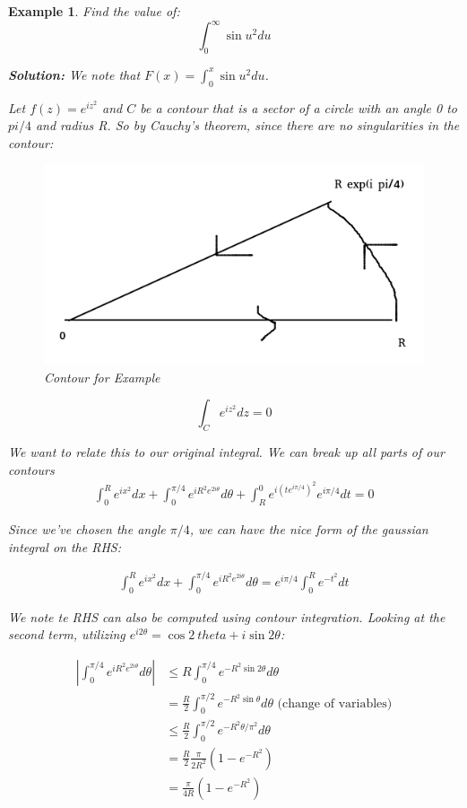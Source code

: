 \documentclass{article}
\newtheorem{ex}{Example}
\theoremstyle{definition}
\begin{document}
\begin{ex}
Find the value of:
$$\int_0^\infty \sin u^2 du$$

\textbf{Solution:}
We note that $F(x) = \int_0^x \sin u^2 du$. 

Let $f(z) = e^{iz^2}$ and $C$ be a contour that is a sector of a circle with an angle 0 to $pi/4$ and radius R. So by Cauchy's theorem, since there are no singularities in the contour:


\begin{figure}[H]
	\centering
	\includegraphics[width=0.4\linewidth]{sector_contour}
	\caption{Contour for Example}
	\label{fig:sectorcontour}
\end{figure}

$$\int_C e^{iz^2} dz=0$$



We want to relate this to our original integral. We can break up all parts of our contours
\begin{align*}
\int_0^R e^{ix^2} dx + \int_0^{\pi/4} e^{i R^2 e^{2i\theta}} d\theta + \int_R^0 e^{i(te^{i\pi/4})^2} e^{i\pi/4} dt = 0 
\end{align*}

Since we've chosen the angle $\pi/4$, we can have the nice form of the gaussian integral on the RHS: 

\begin{align*}
\int_0^R e^{ix^2} dx + \int_0^{\pi/4} e^{i R^2 e^{2i\theta}} d\theta = e^{i\pi/4}  \int_0^R e^{-t^2} dt
\end{align*}

We note te RHS can also be computed using contour integration. Looking at the second term, utilizing $e^{i2\theta} = \cos 2\ theta + i \sin 2 \theta $:

\begin{align*}
\left| \int_0^{\pi/4} e^{i R^2 e^{2i\theta}} d\theta \right| &\leq R \int_0^{\pi/4} e^{-R^2 \sin 2 \theta } d\theta \\
&= \frac{R}{2} \int_{0}^{\pi/2} e^{-R^2 \sin \theta } d\theta \text{   (change of variables)}\\ 
& \leq \frac{R}{2} \int_{0}^{\pi/2} e^{-R^2 \theta /\pi^2} d\theta \\ 
& = \frac{R}{2} \frac{\pi}{2R^2} (1-e^{-R^2}) \\ 
& = \frac{\pi}{4R}(1-e^{-R^2})
\end{align*}


\end{ex}
\end{document}
